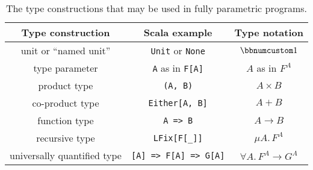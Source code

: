 \begin{table}
\begin{centering}
\begin{tabular}{|c|c|c|}
\hline 
\textbf{\small{}Type construction} & \textbf{\small{}Scala example} & \textbf{\small{}Type notation}\tabularnewline
\hline 
\hline 
{\small{}unit or \textsf{``}named unit\textsf{''}} & {\small{}}\lstinline!Unit!{\small{} or }\lstinline!None! & {\small{}$\bbnum 1$}\tabularnewline
\hline 
{\small{}type parameter} & {\small{}}\lstinline!A!{\small{} as in }\lstinline!F[A]! & {\small{}$A$ as in $F^{A}$}\tabularnewline
\hline 
{\small{}product type} & {\small{}}\lstinline!(A, B)! & {\small{}$A\times B$}\tabularnewline
\hline 
{\small{}co-product type} & {\small{}}\lstinline!Either[A, B]! & {\small{}$A+B$}\tabularnewline
\hline 
{\small{}function type} & {\small{}}\lstinline!A => B! & {\small{}$A\rightarrow B$}\tabularnewline
\hline 
{\small{}recursive type} & {\small{}}\lstinline!LFix[F[_]]! & {\small{}$\mu A.\,F^{A}$}\tabularnewline
\hline 
{\small{}universally quantified type} & {\small{}}\lstinline![A] => F[A] => G[A]! & {\small{}$\forall A.\,F^{A}\rightarrow G^{A}$}\tabularnewline
\hline 
\end{tabular}
\par\end{centering}
\caption{The type constructions
that may be used in fully parametric programs.\label{tab:six-pure-type-constructions}}
\end{table}

